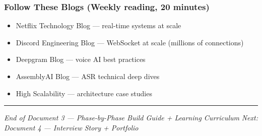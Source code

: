 \documentclass[
  11pt,
]{article}
\providecommand{\tightlist}{%
  \setlength{\itemsep}{0pt}\setlength{\parskip}{0pt}}
\begin{document}
\hypertarget{follow-these-blogs-weekly-reading-20-minutes}{%
\subsubsection{Follow These Blogs (Weekly reading, 20
minutes)}\label{follow-these-blogs-weekly-reading-20-minutes}}

\begin{itemize}
\tightlist
\item
  Netflix Technology Blog --- real-time systems at scale
\item
  Discord Engineering Blog --- WebSocket at scale (millions of
  connections)
\item
  Deepgram Blog --- voice AI best practices
\item
  AssemblyAI Blog --- ASR technical deep dives
\item
  High Scalability --- architecture case studies
\end{itemize}

\begin{center}\rule{0.5\linewidth}{0.5pt}\end{center}

\emph{End of Document 3 --- Phase-by-Phase Build Guide + Learning
Curriculum} \emph{Next: Document 4 --- Interview Story + Portfolio}
\end{document}
